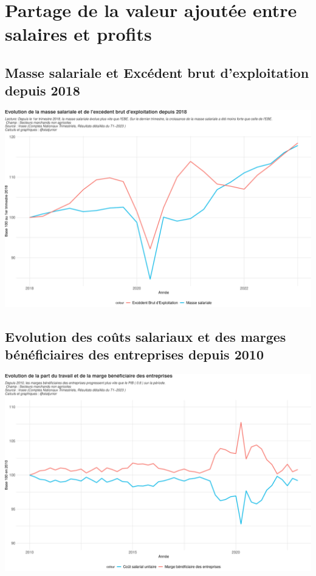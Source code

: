 \documentclass[
  paper=a4,
  ,captions=tableheading
]{scrartcl}
\begin{document}
\hypertarget{partage-de-la-valeur-ajoutuxe9e-entre-salaires-et-profits}{%
\section{Partage de la valeur ajoutée entre salaires et
profits}\label{partage-de-la-valeur-ajoutuxe9e-entre-salaires-et-profits}}

\hypertarget{masse-salariale-et-excuxe9dent-brut-dexploitation-depuis-2018}{%
\subsection{Masse salariale et Excédent brut d'exploitation depuis
2018}\label{masse-salariale-et-excuxe9dent-brut-dexploitation-depuis-2018}}

\includegraphics{rapport_pdf_compte_branche_files/figure-latex/unnamed-chunk-38-1.pdf}

\hypertarget{evolution-des-couxfbts-salariaux-et-des-marges-buxe9nuxe9ficiaires-des-entreprises-depuis-2010}{%
\subsection{Evolution des coûts salariaux et des marges bénéficiaires
des entreprises depuis
2010}\label{evolution-des-couxfbts-salariaux-et-des-marges-buxe9nuxe9ficiaires-des-entreprises-depuis-2010}}

\includegraphics{rapport_pdf_compte_branche_files/figure-latex/unnamed-chunk-41-1.pdf}
\end{document}
